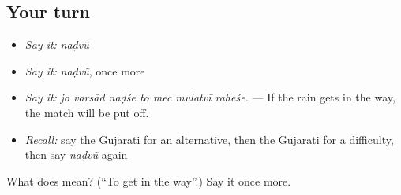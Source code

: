\subsection*{Your turn}
\begin{itemize}
\raggedright
  \item \emph{Say it:} \emph{naḍvũ}
  \item \emph{Say it:} \emph{naḍvũ}, once more
  \item \emph{Say it:} \emph{jo varsād naḍśe to mec mulatvī raheśe.} — If the rain gets in the way, the match will be put off.
  \item \emph{Recall:} say the Gujarati for an alternative, then the Gujarati for a difficulty, then say \emph{naḍvũ} again
\end{itemize}

\begin{tcolorbox}[breakable,colback=teal!4,colframe=teal!35!black,title={Before you move on}]
What does  mean? (\textquotedblleft{}To get in the way\textquotedblright{}.) Say it once more.
\end{tcolorbox}
